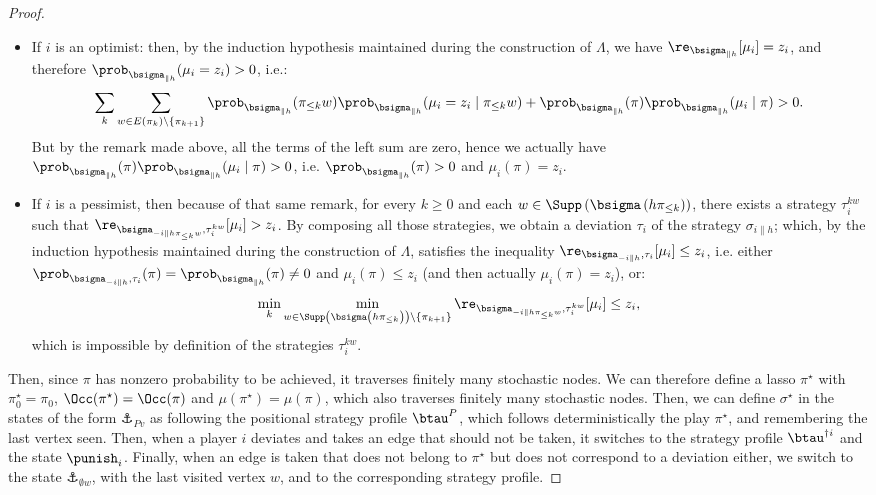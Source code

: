 \begin{proof}
    \begin{itemize}
        \item If $i$ is an optimist: then, by the induction hypothesis maintained during the construction of $\Lambda$, we have $\re_{\bsigma_{\|h}}[\mu_i] = z_i$, and therefore $\prob_{\bsigma_{\|h}}(\mu_i = z_i) > 0$, i.e.:
        $$\sum_k \sum_{w \in E(\pi_k) \setminus \{\pi_{k+1}\}} \prob_{\bsigma_{\|h}}(\pi_{\leq k} w) \prob_{\bsigma_{\|h}}(\mu_i = z_i \mid \pi_{\leq k}w) + \prob_{\bsigma_{\|h}}(\pi) \prob_{\bsigma_{\|h}}(\mu_i \mid \pi) > 0.$$
        But by the remark made above, all the terms of the left sum are zero, hence we actually have $\prob_{\bsigma_{\|h}}(\pi) \prob_{\bsigma_{\|h}}(\mu_i \mid \pi) > 0$, i.e. $\prob_{\bsigma_{\|h}}(\pi) > 0$ and $\mu_i(\pi) = z_i$.

        \item If $i$ is a pessimist, then because of that same remark, for every $k \geq 0$ and each $w \in \Supp\left(\bsigma\left(h\pi_{\leq k}\right)\right)$, there exists a strategy $\tau_i^{kw}$ such that $\re_{\bsigma_{-i\|h\pi_{\leq k}w}, \tau_i^{kw}}[\mu_i] > z_i$.
        By composing all those strategies, we obtain a deviation $\tau_i$ of the strategy $\sigma_{i\|h}$; which, by the induction hypothesis maintained during the construction of $\Lambda$, satisfies the inequality $\re_{\bsigma_{-i\|h}, \tau_i}[\mu_i] \leq z_i$, i.e. either $\prob_{\bsigma_{-i\|h}, \tau_i}(\pi) = \prob_{\bsigma_{\|h}}(\pi) \neq 0$ and $\mu_i(\pi) \leq z_i$ (and then actually $\mu_i(\pi) = z_i$), or:
        $$\min_k \min_{w \in \Supp\left(\bsigma\left(h\pi_{\leq k}\right)\right) \setminus \{\pi_{k+1}\}} \re_{\bsigma_{-i\|h\pi_{\leq k}w}, \tau^{kw}_i}[\mu_i] \leq z_i,$$
        which is impossible by definition of the strategies $\tau_i^{kw}$.
    \end{itemize}

    Then, since $\pi$ has nonzero probability to be achieved, it traverses finitely many stochastic nodes.
    We can therefore define a lasso $\pi^\star$ with $\pi^\star_0 = \pi_0$, $\Occ(\pi^\star) = \Occ(\pi)$ and $\mu(\pi^\star) = \mu(\pi)$, which also traverses finitely many stochastic nodes.
    Then, we can define $\sigma^\star$ in the states of the form $\anchor_{P v}$ as following the positional strategy profile $\btau^P$, which follows deterministically the play $\pi^\star$, and remembering the last vertex seen.
    Then, when a player $i$ deviates and takes an edge that should not be taken, it switches to the strategy profile $\btau^{\dag i}$ and the state $\punish_i$.
    Finally, when an edge is taken that does not belong to $\pi^\star$ but does not correspond to a deviation either, we switch to the state $\anchor_{\emptyset w}$, with the last visited vertex $w$, and to the corresponding strategy profile.


\end{proof}
